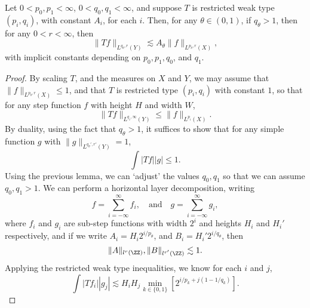 \begin{theorem}
  Let $0 < p_0,p_1 < \infty$, $0 < q_0,q_1 < \infty$, and suppose $T$ is restricted weak type $(p_i,q_i)$, with constant $A_i$, for each $i$. Then, for any $\theta \in (0,1)$, if $q_\theta > 1$, then for any $0 < r < \infty$, then
  \[ \| Tf \|_{L^{q_\theta,r}(Y)} \lesssim A_\theta \| f \|_{L^{p_\theta,r}(X)}, \]
  with implicit constants depending on $p_0, p_1, q_0$, and $q_1$.
\end{theorem}
\begin{proof}
  By scaling $T$, and the measures on $X$ and $Y$, we may assume that $\| f \|_{L^{p_\theta,r}(X)} \leq 1$, and that $T$ is restricted type $(p_i,q_i)$ with constant $1$, so that for any step function $f$ with height $H$ and width $W$,
  \[ \| Tf \|_{L^{q_i,\infty}(Y)} \leq \| f \|_{L^{p_i}(X)}. \]
  By duality, using the fact that $q_\theta > 1$, it suffices to show that for any simple function $g$ with $\| g \|_{L^{q_\theta',r'}(Y)} = 1$,
  \[ \int |Tf| |g| \leq 1. \]
  Using the previous lemma, we can `adjust' the values $q_0,q_1$ so that we can assume $q_0,q_1 > 1$. We can perform a horizontal layer decomposition, writing
  \[ f = \sum_{i = -\infty}^\infty f_i, \quad\text{and}\quad g = \sum_{i = -\infty}^\infty g_i, \]
  where $f_i$ and $g_i$ are sub-step functions with width $2^i$ and heights $H_i$ and $H_i'$ respectively, and if we write $A_i = H_i 2^{i/p_\theta}$, and $B_i = H_i' 2^{i/q_\theta}$, then
  \[ \| A \|_{l^r(\ZZ)}, \| B \|_{l^{r'}(\ZZ)} \lesssim 1. \]
  Applying the restricted weak type inequalities, we know for each $i$ and $j$,
  \[ \int |Tf_i| |g_j| \lesssim H_i H_j \min_{k \in \{0,1\}} \left[ 2^{i/p_k + j(1 - 1/q_k)} \right]. \]


\end{proof}
